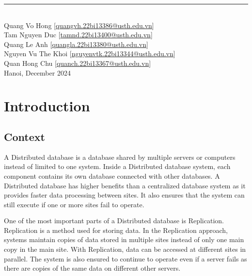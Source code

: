 \documentclass[a4paper,12pt]{report}
\begin{document}
\begin{center}
    \vspace{0.5cm}
    \rule{\textwidth}{0.5pt}
    \vspace{1cm}
    \\
    Quang Vo Hong [\href{mailto:quangvh.22bi13386@usth.edu.vn}{quangvh.22bi13386@usth.edu.vn}] \\
    Tam Nguyen Duc [\href{mailto:tamnd.22bi13400@usth.edu.vn}{tamnd.22bi13400@usth.edu.vn}] \\
    Quang Le Anh [\href{mailto:quangla.22bi13380@usth.edu.vn}{quangla.22bi13380@usth.edu.vn}] \\
    Nguyen Vu The Khoi [\href{mailto:nguyenvtk.22bi13344@usth.edu.vn}{nguyenvtk.22bi13344@usth.edu.vn}] \\
    Quan Hong Chu [\href{mailto:quanch.22bi13367@usth.edu.vn}{quanch.22bi13367@usth.edu.vn}] \\
    \vspace{2cm}
    Hanoi, December 2024
\end{center}

\newpage
\tableofcontents

\newpage
\section{\bfseries Introduction}
\fontsize{13}{16}\selectfont

\subsection{Context}
\hspace*{1em}A Distributed database is a database shared by multiple servers or computers instead of limited to one system. Inside a Distributed database system, each component contains its own database connected with other databases. A Distributed database has higher benefits than a centralized database system as it provides faster data processing between sites. It also ensures that the system can still execute if one or more sites fail to operate.

\hspace*{1em}One of the most important parts of a Distributed database is Replication. Replication is a method used for storing data. In the Replication approach, systems maintain copies of data stored in multiple sites instead of only one main copy in the main site. With Replication, data can be accessed at different sites in parallel. The system is also ensured to continue to operate even if a server fails as there are copies of the same data on different other servers. 
\end{document}
